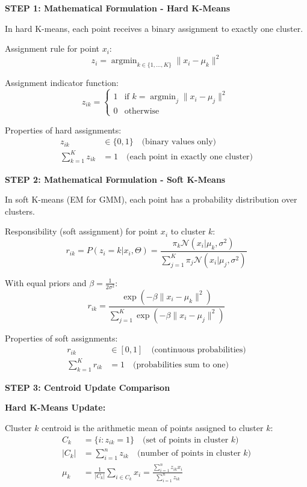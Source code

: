 \documentclass[12pt]{article}
\DeclareMathOperator{\argmin}{argmin}
\begin{document}
\begin{solution}

\textbf{STEP 1: Mathematical Formulation - Hard K-Means}

In hard K-means, each point receives a binary assignment to exactly one cluster.

Assignment rule for point $x_i$:
\[
z_i = \argmin_{k \in \{1, \ldots, K\}} \|x_i - \mu_k\|^2
\]

Assignment indicator function:
\[
z_{ik} = \begin{cases}
1 & \text{if } k = \argmin_j \|x_i - \mu_j\|^2 \\
0 & \text{otherwise}
\end{cases}
\]

Properties of hard assignments:
\begin{align*}
z_{ik} &\in \{0, 1\} \quad \text{(binary values only)} \\
\sum_{k=1}^K z_{ik} &= 1 \quad \text{(each point in exactly one cluster)}
\end{align*}

\textbf{STEP 2: Mathematical Formulation - Soft K-Means}

In soft K-means (EM for GMM), each point has a probability distribution over clusters.

Responsibility (soft assignment) for point $x_i$ to cluster $k$:
\[
r_{ik} = P(z_i = k | x_i, \Theta) = \frac{\pi_k \mathcal{N}(x_i | \mu_k, \sigma^2)}{\sum_{j=1}^K \pi_j \mathcal{N}(x_i | \mu_j, \sigma^2)}
\]

With equal priors and $\beta = \frac{1}{2\sigma^2}$:
\[
r_{ik} = \frac{\exp(-\beta\|x_i - \mu_k\|^2)}{\sum_{j=1}^K \exp(-\beta\|x_i - \mu_j\|^2)}
\]

Properties of soft assignments:
\begin{align*}
r_{ik} &\in [0, 1] \quad \text{(continuous probabilities)} \\
\sum_{k=1}^K r_{ik} &= 1 \quad \text{(probabilities sum to one)}
\end{align*}

\textbf{STEP 3: Centroid Update Comparison}

\textbf{Hard K-Means Update:}

Cluster $k$ centroid is the arithmetic mean of points assigned to cluster $k$:
\begin{align*}
C_k &= \{i : z_{ik} = 1\} \quad \text{(set of points in cluster } k\text{)} \\
|C_k| &= \sum_{i=1}^n z_{ik} \quad \text{(number of points in cluster } k\text{)} \\
\mu_k &= \frac{1}{|C_k|} \sum_{i \in C_k} x_i = \frac{\sum_{i=1}^n z_{ik} x_i}{\sum_{i=1}^n z_{ik}}
\end{align*}


\end{solution}
\end{document}
